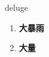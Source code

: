 
\begin{frame}
{\huge deluge}
\begin{center}
\begin{enumerate}\Large
  \item \textbf{大暴雨}
  \item \textbf{大量}
\end{enumerate}
\end{center}
\end{frame}
